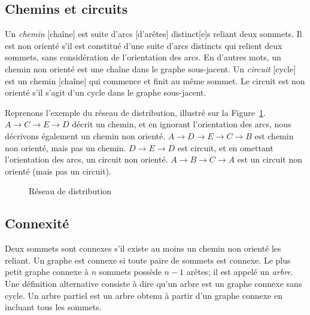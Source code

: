 \subsection{Chemins et circuits}

Un {\sl chemin} [chaîne] est suite d'arcs [d'arêtes] distinct[e]s reliant deux sommets.
Il est non orienté s'il est constitué d'une suite d'arcs distincts qui relient deux sommets, sans considération de l'orientation des arcs.
En d'autres mots, un chemin non orienté est une chaîne dans le graphe sous-jacent.
Un {\sl circuit} [cycle] est un chemin [chaîne] qui commence et finit au même sommet.
Le circuit est non orienté s'il s'agit d'un cycle dans le graphe sous-jacent.

\begin{example}

Reprenons l'exemple du réseau de distribution, illustré sur la Figure~\ref{fig:net_distribution_2}.
$A \rightarrow C \rightarrow E \rightarrow D$ décrit un chemin, et en ignorant l'orientation des arcs, nous décrivons également un chemin non orienté.
$A \rightarrow D \rightarrow E \rightarrow C \rightarrow B$ est chemin non orienté, mais pas un chemin.
$D \rightarrow E \rightarrow D$ est circuit, et en omettant l'orientation des arcs, un circuit non orienté.
$A \rightarrow B \rightarrow C \rightarrow A$ est un circuit non orienté (mais pas un circuit).
\begin{figure}[htbp]
\begin{center}
\caption{Réseau de distribution}
\label{fig:net_distribution_2}
\end{center}
\end{figure}
\end{example}

\subsection{Connexité}

Deux sommets sont connexes s'il existe au moins un chemin non orienté les reliant.
Un graphe est connexe si toute paire de sommets est connexe.
Le plus petit graphe connexe à $n$ sommets possède $n-1$ arêtes; il est appelé un {\sl arbre}.
Une définition alternative consiste à dire qu'un arbre est un graphe connexe sans cycle.
Un arbre partiel est un arbre obtenu à partir d'un graphe connexe en incluant tous les sommets.

